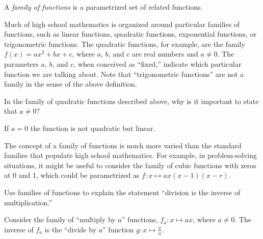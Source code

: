 \documentclass{ximera}
\begin{document}
\begin{definition}
A \emph{family of functions} is a parametrized set of related functions.  
\end{definition}

Much of high school mathematics is organized around particular families of functions, such as linear functions, quadratic functions, exponential functions, or trigonometric functions.  The quadratic functions, for example, are the family $f(x)=ax^2+bx+c$, where $a$, $b$, and $c$ are real numbers and $a\neq 0$.  The parameters $a$, $b$, and $c$, when conceived as ``fixed,'' indicate which particular function we are talking about.  Note that ``trigonometric functions'' are not a family in the sense of the above definition.  

\begin{question}
In the family of quadratic functions described above, why is it important to state that $a\neq 0$?
\begin{freeResponse}
\begin{hint}
If $a=0$ the function is not quadratic but linear.
\end{hint}
\end{freeResponse}
\end{question}

The concept of a family of functions is much more varied than the standard families that populate high school mathematics.  For example, in problem-solving situations, it might be useful to consider the family of cubic functions with zeros at 0 and 1, which could be parametrized as $f:x\mapsto ax(x-1)(x-r)$.  

\begin{question}
Use families of functions to explain the statement ``division is the inverse of multiplication.''  
\begin{freeResponse}
\begin{hint}
Consider the family of ``multiply by $a$'' functions, $f_a:x\mapsto ax$, where $a\neq 0$.  The inverse of $f_a$ is the ``divide by $a$'' function $g:x\mapsto \frac{x}{a}$.   
\end{hint}
\end{freeResponse}
\end{question}



%
%
\end{document}
